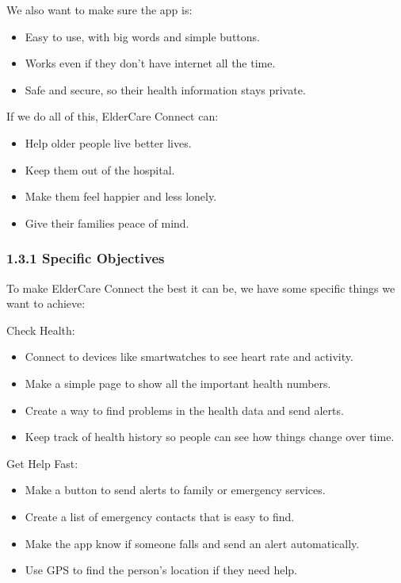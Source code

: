 \documentclass{article}
\begin{document}
We also want to make sure the app is:

\begin{itemize}
    \item Easy to use, with big words and simple buttons.
    \item Works even if they don't have internet all the time.
    \item Safe and secure, so their health information stays private.
\end{itemize}

If we do all of this, ElderCare Connect can:

\begin{itemize}
    \item Help older people live better lives.
    \item Keep them out of the hospital.
    \item Make them feel happier and less lonely.
    \item Give their families peace of mind.
\end{itemize}

\subsubsection*{1.3.1 Specific Objectives}

To make ElderCare Connect the best it can be, we have some specific things we want to achieve:

Check Health:

\begin{itemize}
    \item Connect to devices like smartwatches to see heart rate and activity.
    \item Make a simple page to show all the important health numbers.
    \item Create a way to find problems in the health data and send alerts.
    \item Keep track of health history so people can see how things change over time.
\end{itemize}

Get Help Fast:

\begin{itemize}
    \item Make a button to send alerts to family or emergency services.
    \item Create a list of emergency contacts that is easy to find.
    \item Make the app know if someone falls and send an alert automatically.
    \item Use GPS to find the person's location if they need help.
\end{itemize}
\end{document}
